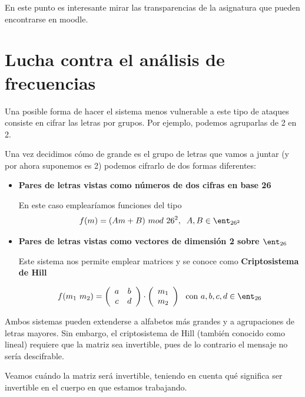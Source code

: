 En este punto es interesante mirar las transparencias de la asignatura que pueden encontrarse en moodle.

\section{Lucha contra el análisis de frecuencias}
Una posible forma de hacer el sistema menos vulnerable a este tipo de ataques consiste en cifrar las letras por grupos. Por ejemplo, podemos agruparlas de 2 en 2.

Una vez decidimos cómo de grande es el grupo de letras que vamos a juntar (y por ahora suponemos es 2) podemos cifrarlo de dos formas diferentes:

\begin{itemize}
\item \textbf{Pares de letras vistas como números de dos cifras en base 26}

En este caso emplearíamos funciones del tipo
\[f(m)= (Am + B) \ mod \ 26^2, \;\; A,B \in \ent_{26^2}\]

\item \textbf{Pares de letras vistas como vectores de dimensión 2 sobre $\ent_{26}$}

Este sistema nos permite emplear matrices y se conoce como \textbf{Criptosistema de Hill}

\[ f(m_1\ m_2) = \left( \begin{array}{cc}
a & b \\
c & d  \end{array} \right) \cdot\left( \begin{array}{c}
m_1 \\
m_2  \end{array} \right) \ \text{ con } a,b,c,d \in \ent_{26}\]
\end{itemize}

Ambos sistemas pueden extenderse a alfabetos más grandes y a agrupaciones de letras mayores. Sin embargo, el criptosistema de Hill (también conocido como lineal) requiere que la matriz sea invertible, pues de lo contrario el mensaje no sería descifrable.

Veamos cuándo la matriz será invertible, teniendo en cuenta qué significa ser invertible en el cuerpo en que estamos trabajando.

